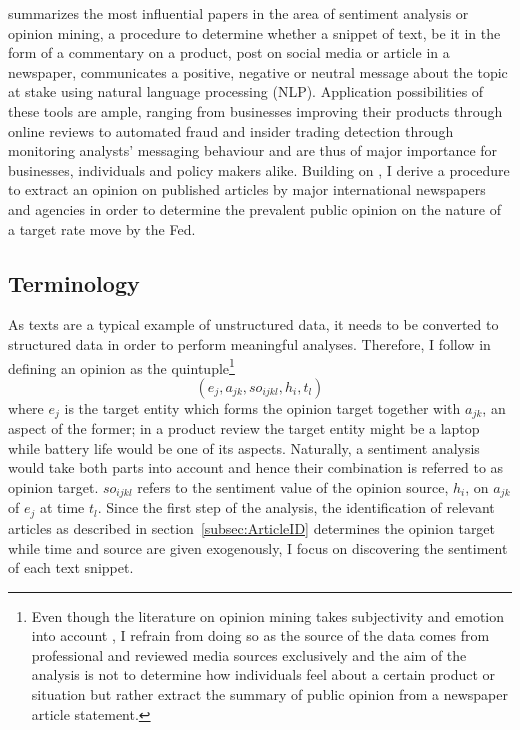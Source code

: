 
\textcite{Liu.2012} summarizes the most influential papers in the area of sentiment analysis or opinion mining, a procedure to determine whether a snippet of text, be it in the form of a commentary on a product, post on social media or article in a newspaper, communicates a positive, negative or neutral message about the topic at stake using natural language processing (NLP). Application possibilities of these tools are ample, ranging from businesses improving their products through online reviews to automated fraud and insider trading detection through monitoring analysts' messaging behaviour and are thus of major importance for businesses, individuals and policy makers alike. 
Building on \textcite{Liu.2012,Feldman.2013,Silge.2017,Friedman.2001}, %
I derive a procedure to extract an opinion on published articles by major international newspapers and agencies in order to determine the prevalent public opinion on the nature of a target rate move by the Fed.

\subsection{Terminology}

As texts are a typical example of unstructured data, it needs to be converted to structured data in order to perform meaningful analyses. Therefore, I follow \textcite{Liu.2010} in defining an opinion as the quintuple\footnote{Even though the literature on opinion mining takes subjectivity and emotion into account \parencite{Wiebe.2000,Wiebe.2004,Riloff.2006}, I refrain from doing so as the source of the data comes from professional and reviewed media sources exclusively and the aim of the analysis is not to determine how individuals feel about a certain product or situation but rather extract the summary of public opinion from a newspaper article statement.} 
\begin{equation}
	(e_j, a_{jk}, so_{ijkl}, h_i, t_l)
\end{equation}
where $e_j$ is the target entity which forms the opinion target together with $a_{jk}$, an aspect of the former; in a product review the target entity might be a laptop while battery life would be one of its aspects. Naturally, a sentiment analysis would take both parts into account and hence their combination is referred to as opinion target. $so_{ijkl}$ refers to the sentiment value of the opinion source, $h_i$, on $a_{jk}$ of $e_j$ at time $t_l$. 
Since the first step of the analysis, the identification of relevant articles as described in section~\ref{subsec:ArticleID} determines the opinion target while time and source are given exogenously, I focus on discovering the sentiment of each text snippet. 


